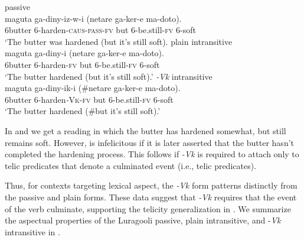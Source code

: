 \documentclass[output=paper]{langsci/langscibook}
\begin{document}
\ea\label{ex:gluckman:15} 
  \ea\label{ex:gluckman:15a}
  {{passive}}\\
  \gll maguta  ga-diny-iz-w-i                     (netare ga-ker-e       ma-doto).\\
      6butter  6-harden-\textsc{caus}-\textsc{pass}-\textsc{fv}       but      6-be.still-\textsc{fv} 6-soft\\
  \glt ‘The butter was hardened (but it’s still soft).
  \ex\label{ex:gluckman:15b}
  {{plain intransitive}}\\
  \gll maguta ga-diny-i      (netare ga-ker-e       ma-doto).\\
      6butter 6-harden-\textsc{fv}   but     6-be.still-\textsc{fv}  6-soft\\
  \glt ‘The butter hardened (but it’s still soft).’
  \ex\label{ex:gluckman:15c}
  {{\textit{-Vk}}{ intransitive}}\\
  \gll maguta ga-diny-ik-i        (\#netare ga-ker-e       ma-doto).\\
      6butter 6-harden\textit{-}\textsc{Vk}-\textsc{fv}     but      6-be.still-\textsc{fv} 6-soft\\
  \glt ‘The butter hardened (\#but it’s still soft).’
  \z
\z

In  and  we get a reading in which the butter has hardened somewhat, but still remains soft. However,  is infelicitous if it is later asserted that the butter hasn’t completed the hardening process. This follows if \textit{-Vk} is required to attach only to telic predicates that denote a culminated event (i.e., telic predicates).

Thus, for contexts targeting lexical aspect, the \textit{-Vk} form patterns distinctly from the passive and plain forms. These data suggest that \textit{-Vk} requires that the event of the verb culminate, supporting the telicity generalization in . We summarize the aspectual properties of the Luragooli passive, plain intransitive, and -\textit{Vk} intransitive in . 

\begin{table}
\caption{Lexical aspect properties of passive, plain intransitive and \textit{-Vk} intransitive}
\label{tab:gluckman:3}

\end{table}
\end{document}
